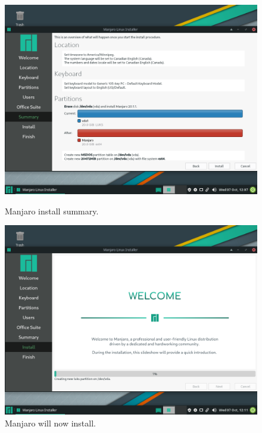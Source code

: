 \documentclass{article}
\begin{document}
\begin{figure}[ht!]
    \centering
    \begin{minipage}{0.5\textwidth}
        \includegraphics[width=.95\linewidth]{images/This_screen_is_a_summary_of_the_changes_you_want_to_make_make_sure_they_are_fine_as_after_this_step_linux_will_install.png}
        \caption{Manjaro install summary.}
        \label{fig:summaryPage}
    \end{minipage}\hfill
        \centering
    \begin{minipage}{0.5\textwidth}
        \includegraphics[width=.95\linewidth]{images/The_installation_will_take_a_while_especially_if_your_computer_is_slow_to_begin_with.png}
        \caption{Manjaro will now install.}
        \label{fig:actualInstallation}
    \end{minipage}\hfill

\end{figure}
\end{document}
